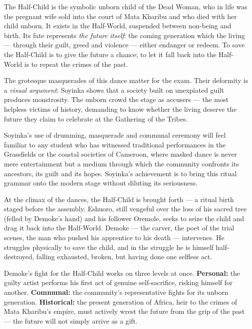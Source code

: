\documentclass[11pt]{article}
\newcommand{\cle}[1]{{\popxbold\color{popdark}#1}}
\newcounter{popsec}
\newcounter{popsub}
\newcommand{\courssub}[1]{%
  \stepcounter{popsub}%
  \par\vspace{9pt}\noindent{\popxbold\fontsize{11.5}{13}\selectfont\color{popink}{\color{poporange}\thepopsec.\thepopsub}\hspace{6pt}#1}\par\nopagebreak\vspace{4pt}
}
\begin{document}
\begin{definition}
The \cle{Half-Child} is the symbolic unborn child of the Dead Woman, who in life was the pregnant wife sold into the court of Mata Kharibu and who died with her child unborn. It exists in the Half-World, suspended between non-being and birth. Its fate represents \emph{the future itself}: the coming generation which the living — through their guilt, greed and violence — either endanger or redeem. To save the Half-Child is to give the future a chance; to let it fall back into the Half-World is to repeat the crimes of the past.
\end{definition}

The grotesque masquerades of this dance matter for the exam. Their deformity is a \emph{visual argument}: Soyinka shows that a society built on unexpiated guilt produces monstrosity. The unborn crowd the stage as accusers — the most helpless victims of history, demanding to know whether the living deserve the future they claim to celebrate at the Gathering of the Tribes.

\begin{savaistu}
Soyinka's use of drumming, masquerade and communal ceremony will feel familiar to any student who has witnessed traditional performances in the Grassfields or the coastal societies of Cameroon, where masked dance is never mere entertainment but a medium through which the community confronts its ancestors, its guilt and its hopes. Soyinka's achievement is to bring this ritual grammar onto the modern stage without diluting its seriousness.
\end{savaistu}

\courssub{The Birth of the Half-Child and Demoke's Struggle}

At the climax of the dances, the Half-Child is brought forth — a ritual birth staged before the assembly. Eshuoro, still vengeful over the loss of his sacred tree (felled by Demoke's hand) and his follower Oremole, seeks to seize the child and drag it back into the Half-World. \cle{Demoke} — the carver, the poet of the trial scenes, the man who pushed his apprentice to his death — intervenes. He struggles physically to save the child, and in the struggle he is himself half-destroyed, falling exhausted, broken, but having done one selfless act.

\begin{exemplebox}
Demoke's fight for the Half-Child works on three levels at once. \textbf{Personal:} the guilty artist performs his first act of genuine self-sacrifice, risking himself for another. \textbf{Communal:} the community's representative fights for its unborn generation. \textbf{Historical:} the present generation of Africa, heir to the crimes of Mata Kharibu's empire, must actively wrest the future from the grip of the past — the future will not simply arrive as a gift.
\end{exemplebox}
\end{document}

